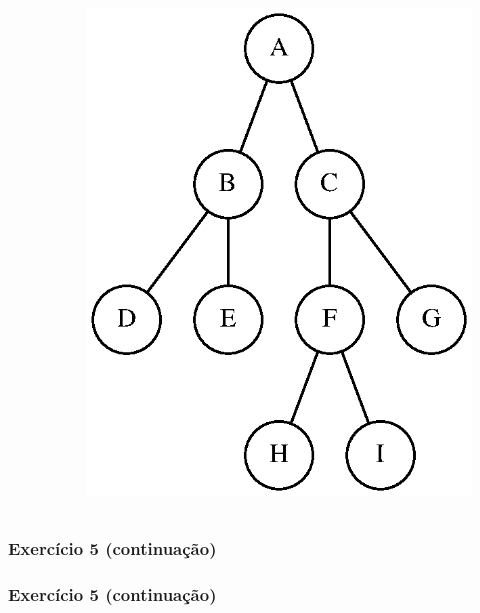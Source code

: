 \documentclass[aspectratio=169]{beamer}
\begin{document}
\begin{frame}[fragile]
\begin{columns}[T]
\begin{column}{0.75\linewidth}
\begin{enumerate}
\end{enumerate}
\end{column}
\begin{column}{0.25\linewidth}
\begin{figure}[h]
	\centering
	\includegraphics[height=0.4\paperheight]{imagens/exercicio05.eps}
\end{figure}
\end{column}
\end{columns}
\end{frame}

\begin{frame}[fragile]\frametitle{Exercício 5 (continuação)}
\fontsize{3pt}{5pt}\selectfont{

}
\end{frame}

\begin{frame}[fragile]\frametitle{Exercício 5 (continuação)}
\fontsize{6pt}{6pt}\selectfont{

}
\end{frame}
\end{document}
